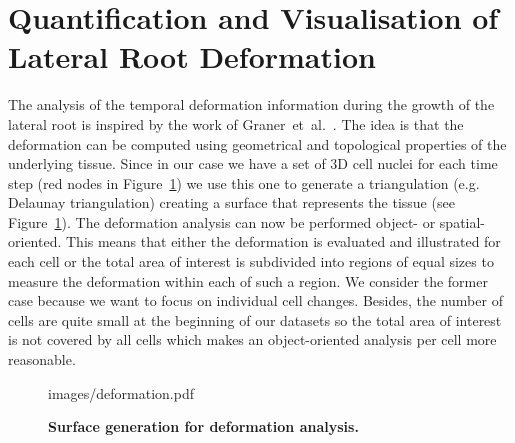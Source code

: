 \documentclass[11pt,a4paper, final]{article}
\begin{document}
\section{Quantification and Visualisation of Lateral Root Deformation}
\noindent
The analysis of the temporal deformation information during the growth of the lateral root is inspired by the work of Graner~et~al.~\cite{graner_et_al_2008}. The idea is that the deformation can be computed using geometrical and topological properties of the underlying tissue. Since in our case we have a set of 3D cell nuclei for each time step (red nodes in Figure~\ref{fig:deformation}) we use this one to generate a triangulation (e.g. Delaunay triangulation) creating a surface that represents the tissue (see Figure~\ref{fig:deformation}). The deformation analysis can now be performed object- or spatial-oriented. This means that either the deformation is evaluated and illustrated for each cell or the total area of interest is subdivided into regions of equal sizes to measure the deformation within each of such a region. We consider the former case because we want to focus on individual cell changes. Besides, the number of cells are quite small at the beginning of our datasets so the total area of interest is not covered by all cells which makes an object-oriented analysis per cell more reasonable.
%
\begin{figure}[htbp]
	\begin{center}
		\begin{overpic}[width=1.\linewidth]{images/deformation.pdf}
		\end{overpic}
\caption[Surface generation for deformation analysis.]
{
{\bf Surface generation for deformation analysis.}
}
	\label{fig:deformation}
	\end{center}
\end{figure}
%
\end{document}
